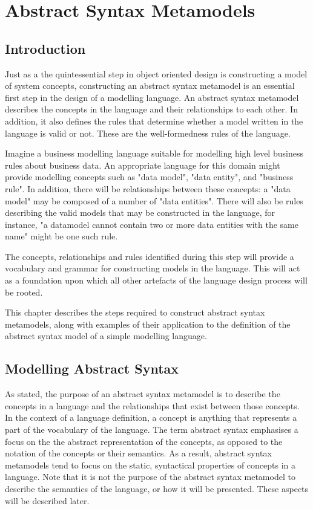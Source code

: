 \chapter{Abstract Syntax Metamodels}
\label{abschapter}

\section{Introduction}

Just as a the quintessential step in object oriented design is constructing a model of system concepts, constructing an abstract syntax metamodel is an essential first step in the design of a modelling language. An abstract syntax metamodel describes the concepts in the language and their relationships to each other. In addition, it also defines the rules that determine whether a model written in the language is valid or not. These are the well-formedness rules of the language. 

Imagine a business modelling language suitable for modelling high level business rules about business data. An appropriate language for this domain might provide modelling concepts such as "data model", "data entity", and "business rule". In addition, there will be relationships between these concepts: a "data model" may be composed of a number of "data entities". There will also be rules describing the valid models that may be constructed in the language, for instance, "a datamodel cannot contain two or more data entities with the same name" might be one such rule. 

The concepts, relationships and rules identified during this step will provide a vocabulary and grammar for constructing models in the language. This will act as a foundation upon which all other artefacts of the language design process will be rooted.  

This chapter describes the steps required to construct abstract syntax metamodels, along with examples of their application to the definition of the abstract syntax model of a simple modelling language. 

\section{Modelling Abstract Syntax}

As stated, the purpose of an abstract syntax metamodel is to describe the concepts in a language and the relationships that exist between those concepts. In the context of a language definition, a concept is anything that represents a part of the vocabulary of the language. The term abstract syntax emphasises a focus on the the abstract representation of the concepts, as opposed to the notation of the concepts or their semantics. As a result, abstract syntax metamodels tend to focus on the static, syntactical properties of concepts in a language. Note that it is not the purpose of the abstract syntax metamodel to describe the semantics of the language, or how it will be presented. These aspects will be described later.

